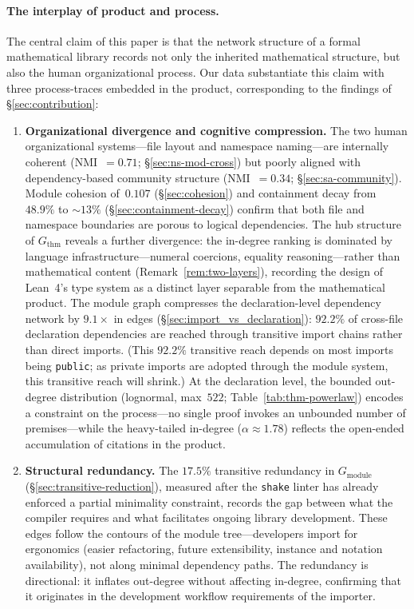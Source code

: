 \paragraph{The interplay of product and process.}
\label{sec:interplay}
The central claim of this paper is that the network structure of a formal mathematical library records not only the inherited mathematical structure, but also the human organizational process. Our data substantiate this claim with three process-traces embedded in the product, corresponding to the findings of \S\ref{sec:contribution}:

\begin{enumerate}
\item \textbf{Organizational divergence and cognitive compression.} The two human organizational systems---file layout and namespace naming---are internally coherent (NMI~$= 0.71$; \S\ref{sec:ns-mod-cross}) but poorly aligned with dependency-based community structure (NMI~$= 0.34$; \S\ref{sec:sa-community}). Module cohesion of~$0.107$ (\S\ref{sec:cohesion}) and containment decay from $48.9\%$ to ${\sim}13\%$ (\S\ref{sec:containment-decay}) confirm that both file and namespace boundaries are porous to logical dependencies. The hub structure of $G_{\mathrm{thm}}$ reveals a further divergence: the in-degree ranking is dominated by language infrastructure---numeral coercions, equality reasoning---rather than mathematical content (Remark~\ref{rem:two-layers}), recording the design of Lean~4's type system as a distinct layer separable from the mathematical product. The module graph compresses the declaration-level dependency network by $9.1\times$ in edges (\S\ref{sec:import_vs_declaration}): $92.2\%$ of cross-file declaration dependencies are reached through transitive import chains rather than direct imports. (This $92.2\%$ transitive reach depends on most imports being \texttt{public}; as private imports are adopted through the module system, this transitive reach will shrink.) At the declaration level, the bounded out-degree distribution (lognormal, max~$522$; Table~\ref{tab:thm-powerlaw}) encodes a constraint on the process---no single proof invokes an unbounded number of premises---while the heavy-tailed in-degree ($\alpha \approx 1.78$) reflects the open-ended accumulation of citations in the product.

\item \textbf{Structural redundancy.} The $17.5\%$ transitive redundancy in $G_{\mathrm{module}}$ (\S\ref{sec:transitive-reduction}), measured after the \texttt{shake} linter has already enforced a partial minimality constraint, records the gap between what the compiler requires and what facilitates ongoing library development. These edges follow the contours of the module tree---developers import for ergonomics (easier refactoring, future extensibility, instance and notation availability), not along minimal dependency paths. The redundancy is directional: it inflates out-degree without affecting in-degree, confirming that it originates in the development workflow requirements of the importer.


\end{enumerate}
